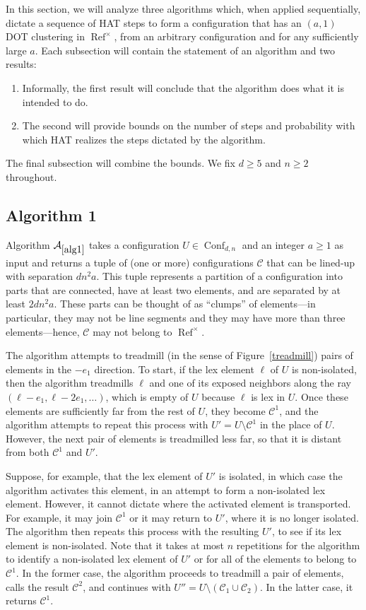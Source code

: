 \documentclass[11pt,reqno]{amsart}
\theoremstyle{definition}
\numberwithin{equation}{section}
\newcommand{\1}{\mathbf{1}}
\DeclareMathOperator{\Refcon}{\mathrm{Ref}}
\newcommand{\CC}{\mathcal{C}}
\DeclareMathOperator{\Conf}{\mathrm{Conf}}
\begin{document}
In this section, we will analyze three algorithms which, when applied sequentially, dictate a sequence of HAT steps to form a configuration that has an $(a,1)$ DOT clustering in $\Refcon^\times$, from an arbitrary configuration and for any sufficiently large $a$. Each subsection will contain the statement of an algorithm and two results:
\begin{enumerate}
\item Informally, the first result will conclude that the algorithm does what it is intended to do. 
\item The second will provide bounds on the number of steps and probability with which HAT realizes the steps dictated by the algorithm.
\end{enumerate}
The final subsection will combine the bounds. We fix $d \geq 5$ and $n \geq 2$ throughout.

\subsection{Algorithm 1}\label{stage1}

Algorithm $\mathcal{A}_{\ref{alg1}}$ takes a configuration $U \in \Conf_{d,n}$ and an integer $a\geq 1$ as input and returns a tuple of (one or more) configurations $\CC$ that can be lined-up with separation $dn^2 a$. This tuple represents a partition of a configuration into parts that are connected, have at least two elements, and are separated by at least $2dn^2 a$. These parts can be thought of as ``clumps'' of elements---in particular, they may not be line segments and they may have more than three elements---hence, $\CC$ may not belong to $\Refcon^\times$.

The algorithm attempts to treadmill (in the sense of Figure~\ref{treadmill}) pairs of elements in the $-e_1$ direction. To start, if the lex element $\ell$ of $U$ is non-isolated, then the algorithm treadmills $\ell$ and one of its exposed neighbors along the ray $(\ell-e_1, \ell-2e_1, \dots)$, which is empty of $U$ because $\ell$ is lex in $U$. Once these elements are sufficiently far from the rest of $U$, they become $\CC^1$, and the algorithm attempts to repeat this process with $U' = U \setminus \CC^1$ in the place of $U$. However, the next pair of elements is treadmilled less far, so that it is distant from both $\CC^1$ and $U'$.

Suppose, for example, that the lex element of $U'$ is isolated, in which case the algorithm activates this element, in an attempt to form a non-isolated lex element. However, it cannot dictate where the activated element is transported. For example, it may join $\CC^1$ or it may return to $U'$, where it is no longer isolated. The algorithm then repeats this process with the resulting $U'$, to see if its lex element is non-isolated. Note that it takes at most $n$ repetitions for the algorithm to identify a non-isolated lex element of $U'$ or for all of the elements to belong to $\CC^1$. In the former case, the algorithm proceeds to treadmill a pair of elements, calls the result $\CC^2$, and continues with $U'' = U \setminus (\CC_1 \cup \CC_2)$. In the latter case, it returns $\CC^1$.
\end{document}
